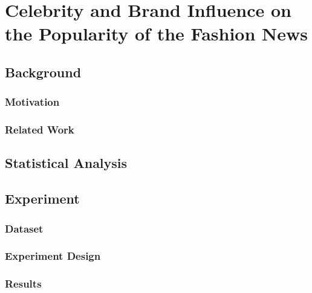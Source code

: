\chapter{Celebrity and Brand Influence on the Popularity of the Fashion News}
\label{exp1}
\section{Background}
\subsection{Motivation}
\subsection{Related Work}
\section{Statistical Analysis}
\section{Experiment}
\subsection{Dataset}
\subsection{Experiment Design}
\subsection{Results}
